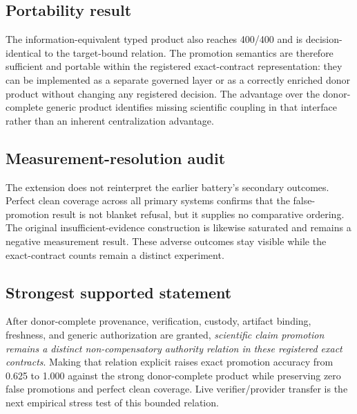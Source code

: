 \subsection{Portability result}
The information-equivalent typed product also reaches 400/400 and is decision-identical to the target-bound relation. The promotion semantics are therefore sufficient and portable within the registered exact-contract representation: they can be implemented as a separate governed layer or as a correctly enriched donor product without changing any registered decision. The advantage over the donor-complete generic product identifies missing scientific coupling in that interface rather than an inherent centralization advantage.

\subsection{Measurement-resolution audit}
The extension does not reinterpret the earlier battery's secondary outcomes. Perfect clean coverage across all primary systems confirms that the false-promotion result is not blanket refusal, but it supplies no comparative ordering. The original insufficient-evidence construction is likewise saturated and remains a negative measurement result. These adverse outcomes stay visible while the exact-contract counts remain a distinct experiment.

\subsection{Strongest supported statement}
After donor-complete provenance, verification, custody, artifact binding, freshness, and generic authorization are granted, \emph{scientific claim promotion remains a distinct non-compensatory authority relation in these registered exact contracts}. Making that relation explicit raises exact promotion accuracy from 0.625 to 1.000 against the strong donor-complete product while preserving zero false promotions and perfect clean coverage. Live verifier/provider transfer is the next empirical stress test of this bounded relation.
